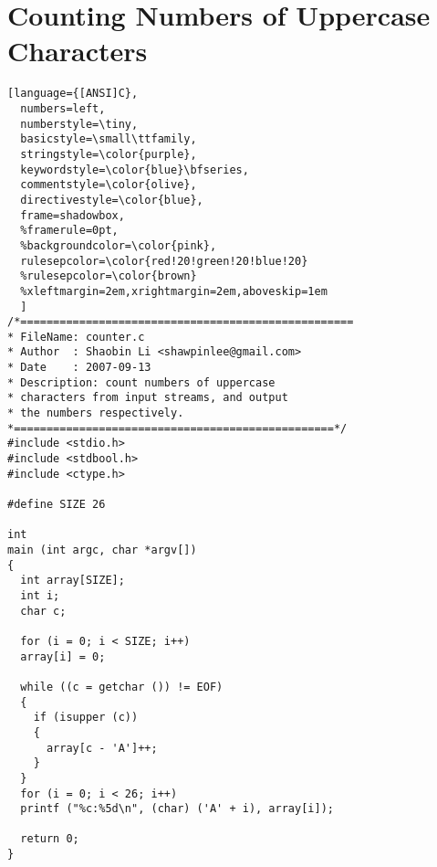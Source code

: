 \documentclass[a4paper,10pt]{article}
\begin{document}
\section{Counting Numbers of Uppercase Characters}
\begin{center}
  \begin{lstlisting}[language={[ANSI]C},
  numbers=left,
  numberstyle=\tiny,
  basicstyle=\small\ttfamily,
  stringstyle=\color{purple},
  keywordstyle=\color{blue}\bfseries,
  commentstyle=\color{olive},
  directivestyle=\color{blue},
  frame=shadowbox,
  %framerule=0pt,
  %backgroundcolor=\color{pink},
  rulesepcolor=\color{red!20!green!20!blue!20}
  %rulesepcolor=\color{brown}
  %xleftmargin=2em,xrightmargin=2em,aboveskip=1em
  ]
/*===================================================
* FileName: counter.c
* Author  : Shaobin Li <shawpinlee@gmail.com>
* Date    : 2007-09-13
* Description: count numbers of uppercase
* characters from input streams, and output
* the numbers respectively.
*=================================================*/
#include <stdio.h>
#include <stdbool.h>
#include <ctype.h>

#define SIZE 26

int
main (int argc, char *argv[])
{
  int array[SIZE];
  int i;
  char c;

  for (i = 0; i < SIZE; i++)
  array[i] = 0;

  while ((c = getchar ()) != EOF)
  {
    if (isupper (c))
    {
      array[c - 'A']++;
    }
  }
  for (i = 0; i < 26; i++)
  printf ("%c:%5d\n", (char) ('A' + i), array[i]);

  return 0;
}
  \end{lstlisting}
\end{center}
\end{document}
